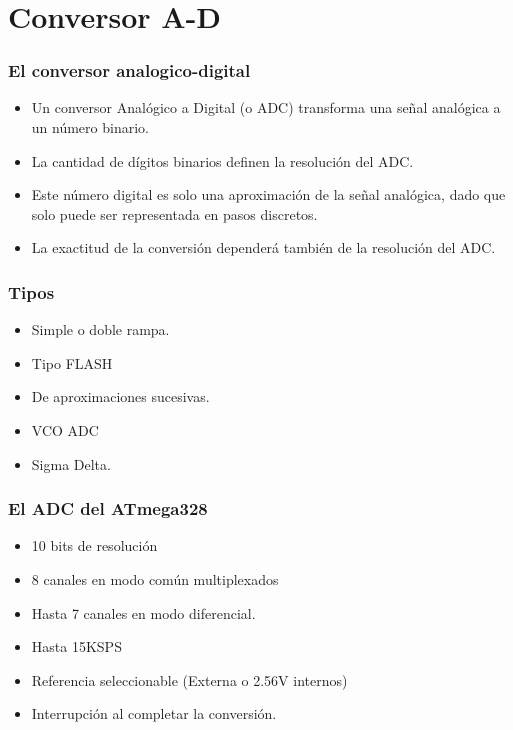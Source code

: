 \documentclass{beamer}
\begin{document}
\begin{frame}[fragile]
\frametitle{}
\begin{lstlisting}[language=java]

\end{lstlisting}
\end{frame}

\begin{frame}[fragile]
\frametitle{}
\begin{lstlisting}[language=java]

\end{lstlisting}
\end{frame}

\section{Conversor A-D}

\begin{frame}
\frametitle{El conversor analogico-digital}
\begin{itemize}
\item Un conversor Analógico a Digital (o ADC)  transforma una señal analógica a un número binario.
\item La cantidad de dígitos binarios definen la resolución del ADC.
\item Este número digital es solo una aproximación de la señal analógica, dado que solo puede ser representada en pasos discretos.
\item La exactitud de la conversión dependerá también de la resolución del ADC.
\end{itemize}
\end{frame}

\begin{frame}
\frametitle{Tipos}
\begin{itemize}
\item Simple o doble rampa.
\item Tipo FLASH
\item De aproximaciones sucesivas.
\item VCO ADC
\item Sigma Delta.
\end{itemize}
\end{frame}

\begin{frame}
\frametitle{El ADC del ATmega328}
\begin{itemize}
\item 10 bits de resolución
\item 8 canales en modo común multiplexados
\item Hasta 7 canales en modo diferencial.
\item Hasta 15KSPS
\item Referencia seleccionable (Externa o 2.56V internos) 
\item Interrupción al completar la conversión.
\end{itemize}
\end{frame}
\end{document}
